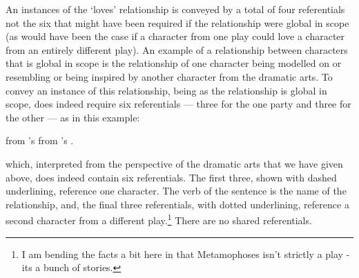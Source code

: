 An instances of the `loves' relationship is conveyed by a total of four referentials
 not the six that might have been required
if the relationship were global in scope (as would have been the case if a
 character from one play could love  a character from an entirely different play).
 An example of a relationship between characters that is global in scope 
 is the relationship of one character being modelled on or resembling or being inspired 
 by another character from the dramatic arts.
 To convey an instance of this relationship, being as the relationship is global in scope,  does indeed require
 six referentials --- three for the one party and three for the other --- as in this example:
\begin{erquote}
\parbox{9.0cm}{\linespread{1.3}\normalsize
{} from 's 
            from 's .}
\end{erquote}
which, interpreted from the perspective of the dramatic arts that we have given above, does indeed contain six referentials. 
The first three, shown with dashed underlining, reference one character.
The verb of the sentence is the name of the relationship, and, 
the final three referentials, with dotted underlining, 
reference a second character from a different play.\footnote{I am bending the facts a bit here 
in that Metamophoses isn't strictly a play - its a bunch of stories.} 
There are no shared referentials.









 

